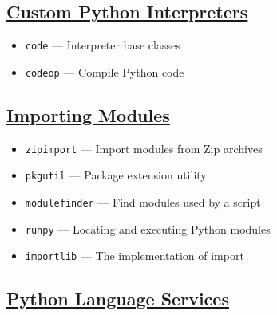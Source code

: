 \documentclass[]{book}
\providecommand{\tightlist}{%
  \setlength{\itemsep}{0pt}\setlength{\parskip}{0pt}}
\theoremstyle{definition}
\theoremstyle{definition}
\theoremstyle{definition}
\theoremstyle{remark}
\begin{document}
\subsection{\texorpdfstring{\href{https://docs.python.org/3.7/library/custominterp.html}{Custom
Python
Interpreters}}{Custom Python Interpreters}}\label{custom-python-interpreters}

\begin{itemize}
\tightlist
\item
  \texttt{code} --- Interpreter base classes
\item
  \texttt{codeop} --- Compile Python code
\end{itemize}

\subsection{\texorpdfstring{\href{https://docs.python.org/3.7/library/modules.html}{Importing
Modules}}{Importing Modules}}\label{importing-modules}

\begin{itemize}
\tightlist
\item
  \texttt{zipimport} --- Import modules from Zip archives
\item
  \texttt{pkgutil} --- Package extension utility
\item
  \texttt{modulefinder} --- Find modules used by a script
\item
  \texttt{runpy} --- Locating and executing Python modules
\item
  \texttt{importlib} --- The implementation of import
\end{itemize}

\subsection{\texorpdfstring{\href{https://docs.python.org/3.7/library/language.html}{Python
Language
Services}}{Python Language Services}}\label{python-language-services}
\end{document}

